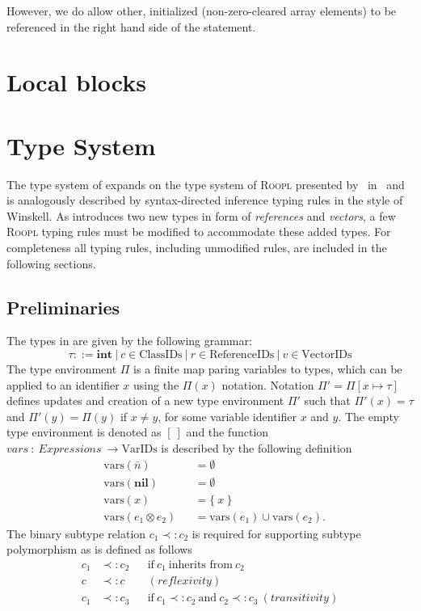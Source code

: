 However, we do allow other, initialized (non-zero-cleared array elements) to be referenced in the right hand side of the statement.

\section{Local blocks}
\label{sec:local-blocks}


\section{Type System}
\label{sec:type-system}
The type system of \rooplpp expands on the type system of \textsc{Roopl} presented by~\citeauthor{th:roopl} in~\cite{th:roopl} and is analogously described by syntax-directed inference typing rules in the style of Winskell. As \rooplpp introduces two new types in form of \textit{references} and \textit{vectors}, a few \textsc{Roopl} typing rules must be modified to accommodate these added types. For completeness all typing rules, including unmodified rules, are included in the following sections.

\subsection{Preliminaries}
\label{subsec:preliminaries}
The types in \rooplpp are given by the following grammar:
\begin{equation*}
    \tau ::= \textbf{int}\ |\ c \in \text{ClassIDs}\ |\ r \in \text{ReferenceIDs}\ |\ v \in \text{VectorIDs}
\end{equation*}
The type environment $\Pi$ is a finite map paring variables to types, which can be applied to an identifier $x$ using the $\Pi(x)$ notation. Notation $\Pi' = \Pi[x \mapsto \tau]$ defines updates and creation of a new type environment $\Pi'$ such that $\Pi'(x) = \tau$ and $\Pi'(y) = \Pi(y)$ if $x \not= y$, for some variable identifier $x$ and $y$. The empty type environment is denoted as $[\ ]$ and the function $vars\ :\ Expressions\ \to \text{VarIDs}$ is described by the following definition
\begin{align*}
    &\text{vars}(\bar{n}) &&= \emptyset\\
    &\text{vars}(\textbf{nil}) &&= \emptyset\\
    &\text{vars}(x) &&= \{\ x\ \}\\
    &\text{vars}(e_1 \otimes e_2) &&= \text{vars}(e_1) \cup \text{vars}(e_2).
\end{align*}
The binary subtype relation $c_1 \prec: c_2$ is required for supporting subtype polymorphism as is defined as follows
\begin{align*}
    c_1 &\prec: c_2 &&\text{if}\ c_1\ \text{inherits from}\ c_2\\
    c   &\prec: c   &&(reflexivity)\\
    c_1 &\prec: c_3 &&\text{if}\ c_1 \prec: c_2\ \text{and}\ c_2 \prec: c_3\ (transitivity)
\end{align*}

